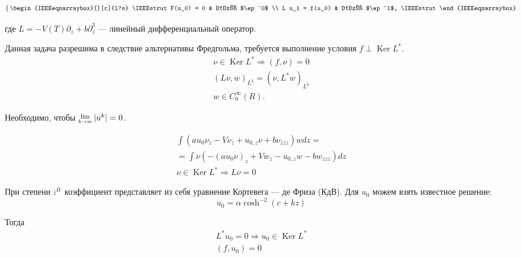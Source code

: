 \begin{equation} \label{Eq:system}
    \left\{ \,
    \begin{IEEEeqnarraybox}[][c]{l?s}
        \IEEEstrut
            F(u_0) = 0 & для $\ep^0$ \\
            L u_1 = f(u_0) & для $\ep^1$,
        \IEEEstrut
    \end{IEEEeqnarraybox}
    \right.
\end{equation}

где $L = -V(T) \partial_z + b \partial_z^3$
--- линейный дифференциальный оператор.

Данная задача разрешима в следствие альтернативы Фредгольма,
требуется выполнение условия $f \perp \operatorname{Ker}L^*$.
\begin{equation*}
    \begin{gathered}
        \nu \in \operatorname{Ker}L^* \Rightarrow (f, \nu) = 0 \\
        (L \nu, w)_{L^2} = (\nu, L^* w)_{L^2} \\
        w \in C_0^\infty(R).
    \end{gathered}
\end{equation*}

Необходимо, чтобы $\Lim{k \rightarrow \infty} |u^k| = 0$.

\begin{equation*}
    \begin{gathered}
        \int \left(a u_0 \nu_z - V \nu_z + u_{0,z} \nu + b \nu_{zzz} \right) w dz = \\
        = \int \nu \left( -(a u_0 \nu)_z + V w_z - u_{0,z} w - b w_{zzz} \right) dz \\
        \nu \in \operatorname{Ker}L^* \Rightarrow L \nu = 0
    \end{gathered}
\end{equation*}

При степени $\varepsilon^0$ коэффициент
представляет из себя уравнение Кортевега --- де Фриза (КдВ).
Для $u_0$ можем взять известное решение:
\begin{equation*}
    u_0 = \alpha \cosh^{-2}(c + k z) 
\end{equation*}

Тогда
\begin{equation*}
    \begin{gathered}
        L^* u_0 = 0 \Rightarrow u_0 \in \operatorname{Ker}L^* \\
        (f, u_0) = 0
    \end{gathered}
\end{equation*}

